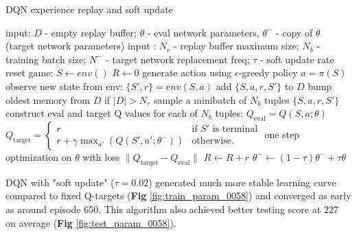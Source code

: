 \documentclass[10pt]{article}
\begin{document}
\begin{algorithm}
\caption{DQN experience replay and soft update}
\begin{algorithmic}
\STATE input: $D$ - empty replay buffer; $\theta$ - eval network parameters, $\theta^-$ - copy of $\theta$ (target network parameters)
\STATE input : $N_r$ - replay buffer maximum size; $N_b$ - training batch size; $N^-$ - target network replacement freq; $\tau$ - soft update rate
\REPEAT
\STATE reset game: $S\leftarrow env()$
\STATE $R\leftarrow 0$
\STATE generate action using $\epsilon$-greedy policy $a=\pi(S)$
\STATE observe new state from env: $\{S',r\} = env(S,a)$
\STATE add $\{S,a,r,S'\}$ to $D$
\STATE bump oldest memory from $D$ if $|D|> N_r$
\STATE sample a minibatch of $N_b$ tuples $\{S,a,r,S'\}$ 
\STATE construct eval and target Q values for each of $N_b$ tuples:
\STATE $Q_{\text{eval}}=Q(S,a;\theta)$
\STATE $Q_{\text{target}}=\left\{
\begin{array}{lr}
             r & \text{if $S'$ is terminal} \\
             r+\gamma \max_{a'}(Q(S',a';\theta^-)) & \text{otherwise.}
\end{array}
\right.
$
\STATE one step optimization on $\theta$ with loss $\lVert Q_{\text{target}}-Q_{\text{eval}}\rVert$
\STATE $R\leftarrow R+r$
\STATE $\theta^- \leftarrow (1-\tau)\theta^- + \tau\theta$
\ENDFOR
{}
\end{algorithmic}
\end{algorithm}

DQN with "soft update" ($\tau=0.02$) generated much more stable learning curve compared to fixed Q-targets (\textbf{Fig} \ref{fig:train_param_0058}) and converged as early as around episode 650. This algorithm also achieved better testing score at 227 on average (\textbf{Fig} \ref{fig:test_param_0058}).
\end{document}
